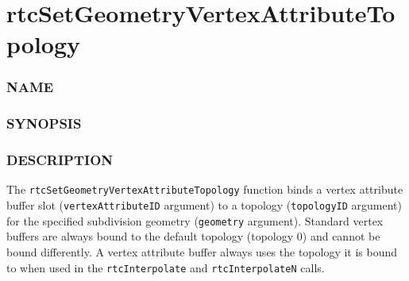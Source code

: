\pagebreak

\section{rtcSetGeometryVertexAttributeTopology}\label{rtcsetgeometryvertexattributetopology}

\subsubsection{NAME}\label{name}

\begin{Shaded}
\begin{Highlighting}[]
\OperatorTok{{-}}
\end{Highlighting}
\end{Shaded}

\subsubsection{SYNOPSIS}\label{synopsis}

\begin{Shaded}
\begin{Highlighting}[]

\OperatorTok{(}
\OperatorTok{,}
   \OperatorTok{,}
   
\OperatorTok{);}
\end{Highlighting}
\end{Shaded}

\subsubsection{DESCRIPTION}\label{description}

The \texttt{rtcSetGeometryVertexAttributeTopology} function binds a
vertex attribute buffer slot (\texttt{vertexAttributeID} argument) to a
topology (\texttt{topologyID} argument) for the specified subdivision
geometry (\texttt{geometry} argument). Standard vertex buffers are
always bound to the default topology (topology 0) and cannot be bound
differently. A vertex attribute buffer always uses the topology it is
bound to when used in the \texttt{rtcInterpolate} and
\texttt{rtcInterpolateN} calls.

